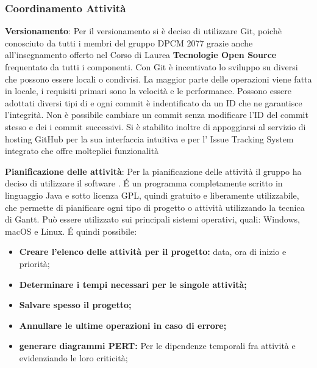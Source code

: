 \subsubsection{Coordinamento Attività}
\begin{description}
\item{\textbf{Versionamento}}: Per il versionamento si è deciso di utilizzare Git, poichè conosciuto da tutti i membri del gruppo DPCM 2077 grazie anche all'insegnamento offerto
nel Corso di Laurea \textbf{Tecnologie Open Source} frequentato da tutti i componenti. Con Git è incentivato lo sviluppo su  diversi che possono essere locali o condivisi.
La maggior parte delle operazioni viene fatta in locale, i requisiti primari sono la velocità e le performance.
Possono essere adottati diversi tipi di  e ogni commit è indentificato da un ID che ne garantisce l'integrità.
Non è possibile cambiare un commit senza modificare l’ID del commit stesso e dei i commit successivi.  
Si è stabilito inoltre di appoggiarsi al servizio di hosting GitHub per la sua interfaccia intuitiva e per l' Issue Tracking System integrato che offre molteplici funzionalità

\item{\textbf{Pianificazione delle attività}}:  Per la pianificazione delle attività il gruppo ha deciso di utilizzare il software \textbf{}. 
\'E un programma completamente scritto in linguaggio Java e sotto licenza GPL, quindi gratuito e liberamente utilizzabile, che permette di pianificare ogni tipo di progetto o attività utilizzando la tecnica di Gantt.
Può essere utilizzato sui principali sistemi operativi, quali: Windows, macOS e Linux.
\'E quindi possibile:
\begin{itemize}
\item{\textbf{Creare l'elenco delle attività per il progetto:} data, ora di inizio e priorità;}
\item{\textbf{Determinare i tempi necessari per le singole attività;}}
\item{\textbf{Salvare spesso il progetto;}}
\item{\textbf{Annullare le ultime operazioni in caso di errore;}}
\item{\textbf{generare diagrammi PERT:} Per le dipendenze temporali fra attività e evidenziando le loro criticità;}
\end{itemize} 


\end{description}
